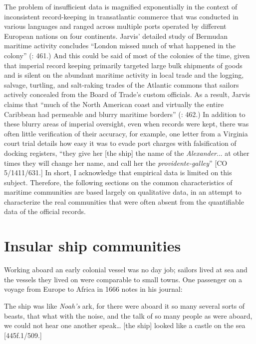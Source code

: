 The problem of insufficient data is magnified exponentially in the context of inconsistent record-keeping in transatlantic commerce that was conducted in various languages and ranged across multiple ports operated by different European nations on four continents. Jarvis’ detailed study of Bermudan maritime activity concludes “London missed much of what happened in the colony” (\citealt{Jarvis2010}: 461.) And this could be said of most of the colonies of the time, given that imperial record keeping primarily targeted large bulk shipments of goods and is silent on the abundant maritime activity in local trade and the logging, salvage, turtling, and salt-raking trades of the Atlantic commons that sailors actively concealed from the Board of Trade’s custom officials. As a result, Jarvis claims that “much of the North American coast and virtually the entire Caribbean had permeable and blurry maritime borders” (\citealt{Jarvis2010}: 462.) In addition to these blurry areas of imperial oversight, even when records were kept, there was often little verification of their accuracy, for example, one letter from a Virginia court trial details how easy it was to evade port charges with falsification of docking registers, “they give her [the ship] the name of the \textit{Alexander}... at other times they will change her name, and call her the \textit{providente-galley}” [CO 5/1411/631.] In short, I acknowledge that empirical data is limited on this subject.  Therefore, the following sections on the common characteristics of maritime communities are based largely on qualitative data, in an attempt to characterize the real communities that were often absent from the quantifiable data of the official records.

\section{{Insular} {ship} {communities}}%

Working aboard an early colonial vessel was no day job; sailors lived at sea and the vessels they lived on were comparable to small towns. One passenger on a voyage from Europe to Africa in 1666 notes in his journal: 

The ship was like \textit{Noah’s} ark, for there were aboard it so many several sorts of beasts, that what with the noise, and the talk of so many people as were aboard, we could not hear one another speak… [the ship] looked like a castle on the sea [445f.1/509.]

